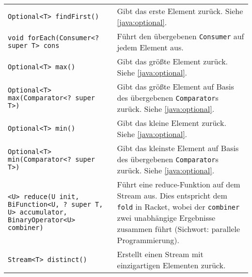\begin{sidewaystable}
\begin{tabular}{p{8cm} | p{13cm}}
		\texttt{Optional<T> findFirst()}                                                                 & Gibt das erste Element zurück. Siehe \ref{java:optional}.                                                                                                                                                     \\
		\texttt{void forEach(Consumer<? super T> cons}                                                   & Führt den übergebenen \texttt{Consumer} auf jedem Element aus.                                                                                                                                                \\
		\texttt{Optional<T> max()}                                                                       & Gibt das größte Element zurück. Siehe \ref{java:optional}.                                                                                                                                                    \\
		\texttt{Optional<T> max(Comparator<? super T>)}                                                  & Gibt das größte Element auf Basis des übergebenen \texttt{Comparator}s zurück. Siehe \ref{java:optional}.                                                                                                     \\
		\texttt{Optional<T> min()}                                                                       & Gibt das kleine Element zurück. Siehe \ref{java:optional}.                                                                                                                                                    \\
		\texttt{Optional<T> min(Comparator<? super T>)}                                                  & Gibt das kleinste Element auf Basis des übergebenen \texttt{Comparator}s zurück. Siehe \ref{java:optional}.                                                                                                   \\
		\texttt{<U> reduce(U init, BiFunction<U, ? super T, U> accumulator, BinaryOperator<U> combiner)} & Führt eine reduce-Funktion auf dem Stream aus. Dies entspricht dem \texttt{fold} in Racket, wobei der \texttt{combiner} zwei unabhängige Ergebnisse zusammen führt (Sichwort: parallele Programmierung).      \\
		\hline
		\texttt{Stream<T> distinct()}                                                                    & Erstellt einen Stream mit einzigartigen Elementen zurück.                                                                                                                                                     \\

\end{tabular}
\end{sidewaystable}
